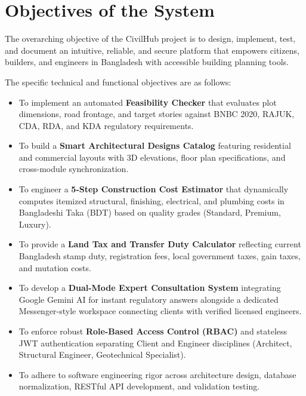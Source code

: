 \documentclass[12pt,a4paper]{article}
\begin{document}
\section{Objectives of the System}
The overarching objective of the CivilHub project is to design, implement, test, and document an intuitive, reliable, and secure platform that empowers citizens, builders, and engineers in Bangladesh with accessible building planning tools.

The specific technical and functional objectives are as follows:
\begin{itemize}
    \item To implement an automated \textbf{Feasibility Checker} that evaluates plot dimensions, road frontage, and target stories against BNBC 2020, RAJUK, CDA, RDA, and KDA regulatory requirements.
    \item To build a \textbf{Smart Architectural Designs Catalog} featuring residential and commercial layouts with 3D elevations, floor plan specifications, and cross-module synchronization.
    \item To engineer a \textbf{5-Step Construction Cost Estimator} that dynamically computes itemized structural, finishing, electrical, and plumbing costs in Bangladeshi Taka (BDT) based on quality grades (Standard, Premium, Luxury).
    \item To provide a \textbf{Land Tax and Transfer Duty Calculator} reflecting current Bangladesh stamp duty, registration fees, local government taxes, gain taxes, and mutation costs.
    \item To develop a \textbf{Dual-Mode Expert Consultation System} integrating Google Gemini AI for instant regulatory answers alongside a dedicated Messenger-style workspace connecting clients with verified licensed engineers.
    \item To enforce robust \textbf{Role-Based Access Control (RBAC)} and stateless JWT authentication separating Client and Engineer disciplines (Architect, Structural Engineer, Geotechnical Specialist).
    \item To adhere to software engineering rigor across architecture design, database normalization, RESTful API development, and validation testing.
\end{itemize}

\end{document}
